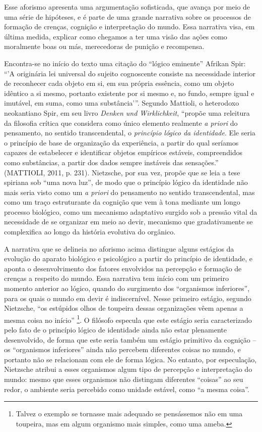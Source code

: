 \documentclass[
	12pt,				%
	openright,			%
	oneside,			%
	a4paper,			%
	english,			%
	french,				%
	spanish,			%
	brazil				%
	]{abntex2}
\begin{document}
Esse aforismo apresenta uma argumentação sofisticada, que avança por meio de uma série de hipóteses, e é parte de uma grande narrativa sobre os processos de formação de crenças, cognição e interpretação do mundo. Essa narrativa visa, em última medida, explicar como chegamos a ter uma visão das ações como moralmente boas ou más, merecedoras de punição e recompensa. 

Encontra-se no início do texto uma citação do “lógico eminente” Afrikan Spir: “'A originária lei universal do sujeito cognoscente consiste na necessidade interior de reconhecer cada objeto em si, em sua própria essência, como um objeto idêntico a si mesmo, portanto existente por si mesmo e, no fundo, sempre igual e imutável, em suma, como uma substância'”. Segundo Mattioli, o heterodoxo neokantiano Spir, em seu livro \textit{Denken und Wirklichkeit}, “propõe uma releitura da filosofia crítica que considera como único elemento realmente \textit{a priori} do pensamento, no sentido transcendental, o \textit{princípio lógico da identidade}. Ele seria o princípio de base de organização da experiência, a partir do qual seríamos capazes de estabelecer e identificar objetos empíricos estáveis, compreendidos como substâncias, a partir dos dados sempre instáveis das sensações.” (MATTIOLI, 2011, p. 231). Nietzsche, por sua vez, propõe que se leia a tese spiriana sob “uma nova luz”, de modo que o princípio lógico da identidade não mais seria visto como um \textit{a priori} do pensamento no sentido transcendental, mas como um traço estruturante da cognição que vem à tona mediante um longo processo biológico, como um mecanismo adaptativo surgido sob a pressão vital da necessidade de se organizar em meio ao devir, mecanismo que gradativamente se complexifica ao longo da história evolutiva do orgânico.

A narrativa que se delineia no aforismo acima distingue alguns estágios da evolução do aparato biológico e psicológico a partir do princípio de identidade, e aponta o desenvolvimento dos fatores envolvidos na percepção e formação de crenças a respeito do mundo. Essa narrativa tem início com um primeiro momento anterior ao lógico, quando do surgimento dos “organismos inferiores”, para os quais o mundo em devir é indiscernível. Nesse primeiro estágio, segundo Nietzsche, “os estúpidos olhos de toupeira dessas organizações vêem apenas a mesma coisa no início”
\footnote{Talvez o exemplo se tornasse mais adequado se pensássemos não em uma toupeira, mas em algum organismo mais simples, como uma ameba.}. 
O filósofo especula que este estágio seria caracterizado pelo fato de o princípio lógico de identidade ainda não estar plenamente desenvolvido, de forma que este seria também um estágio primitivo da cognição – os “organismos inferiores” ainda não percebem diferentes coisas no mundo, e portanto não se relacionam com ele de forma lógica. No entanto, por especulação, Nietzsche atribui a esses organismos algum tipo de percepção e interpretação do mundo: mesmo que esses organismos não distingam diferentes “coisas” ao seu redor, o ambiente seria percebido como unidade estável, como “a mesma coisa”.
\end{document}
